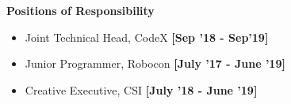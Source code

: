 \colorbox{titleColor}{\parbox{7.2in}{\textbf{Positions of Responsibility}}}
\begin{itemize}
    \vspace{-0.2ex}\setlength\itemsep{-0.75ex}
    \item Joint Technical Head, CodeX  \hfill {\small{{\textbf{[Sep '18 - Sep'19]}}}}
    \item Junior Programmer, Robocon  \hfill {\small{{\textbf{[July '17 - June '19]}}}}
    \item Creative Executive, CSI  \hfill {\small{{\textbf{[July '18 - June '19]}}}}
\end{itemize}